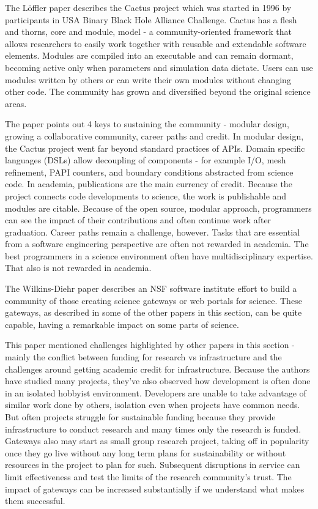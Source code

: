 \documentclass[11pt, oneside]{amsart}
\begin{document}
The L\"{o}ffler paper describes the Cactus project which was started in 1996 by
participants in USA Binary Black Hole Alliance Challenge. Cactus has a flesh
and thorns, core and module, model - a community-oriented framework that allows
researchers to easily work together with reusable and extendable software
elements. Modules are compiled into an executable and can remain dormant,
becoming active only when parameters and simulation data dictate. Users can
use modules written by others or can write their own modules without changing
other code. The community has grown and diversified beyond the original science
areas.

The paper points out 4 keys to sustaining the community - modular design,
growing a collaborative community, career paths and credit. In modular design,
the Cactus project went far beyond standard practices of APIs. Domain specific
languages (DSLs) allow decoupling of components - for example I/O, mesh
refinement, PAPI counters, and boundary conditions abstracted from science
code. In academia, publications are the main currency of credit. Because the
project connects code developments to science, the work is publishable and
modules are citable. Because of the open source, modular approach, programmers
can see the impact of their contributions and often continue work after
graduation. Career paths remain a challenge, however. Tasks that are essential
from a software engineering perspective are often not rewarded in academia. The
best programmers in a science environment often have multidisciplinary
expertise. That also is not rewarded in academia.

The Wilkins-Diehr paper describes an NSF software institute effort to build a
community of those creating science gateways or web portals for science. These
gateways, as described in some of the other papers in this section, can be
quite capable, having a remarkable impact on some parts of science.

This paper mentioned challenges highlighted by other papers in this section -
mainly the conflict between funding for research vs infrastructure and the
challenges around getting academic credit for infrastructure. Because the
authors have studied many projects, they've also observed how development is
often done in an isolated hobbyist environment. Developers are unable to take
advantage of similar work done by others, isolation even when projects have
common needs. But often projects struggle for sustainable funding because they
provide infrastructure to conduct research and many times only the research is
funded. Gateways also may start as small group research project, taking off in
popularity once they go live without any long term plans for sustainability or
without resources in the project to plan for such. Subsequent disruptions in
service can limit effectiveness and test the limits of the research community's
trust. The impact of gateways can be increased substantially if we understand
what makes them successful.
\end{document}
